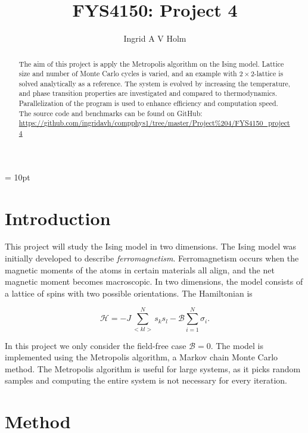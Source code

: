 \documentclass[11pt]{article}
\begin{document}
\title{FYS4150: Project 4}
\author{Ingrid A V Holm}
\maketitle


\marginparwidth = 10pt

\begin{abstract}
The aim of this project is apply the Metropolis algorithm on the Ising model. Lattice size and number of Monte Carlo cycles is varied, and an example with $2 \times 2$-lattice is solved analytically as a reference. The system is evolved by increasing the temperature, and phase transition properties are investigated and compared to thermodynamics. Parallelization of the program is used to enhance efficiency and computation speed. The source code and benchmarks can be found on GitHub: \url{https://github.com/ingridavh/compphys1/tree/master/Project%204/FYS4150_project4}
\end{abstract}


\section{Introduction}

\begin{flushleft}
This project will study the Ising model in two dimensions. The Ising model was initially developed to describe \textit{ferromagnetism}. Ferromagnetism occurs when the magnetic moments of the atoms in certain materials all align, and the net magnetic moment becomes macroscopic. In two dimensions, the model consists of a lattice of spins with two possible orientations. The Hamiltonian is 

\begin{equation*}
\mathcal{H} = -J \sum^N_{<kl>} s_k s_l - \mathcal{B} \sum_{i=1}^N \sigma_i.
\end{equation*}

In this project we only consider the field-free case $\mathcal{B}=0$. The model is implemented using the Metropolis algorithm, a Markov chain Monte Carlo method. The Metropolis algorithm is useful for large systems, as it picks random samples and computing the entire system is not necessary for every iteration.
\end{flushleft}


\section{Method}
\end{document}
